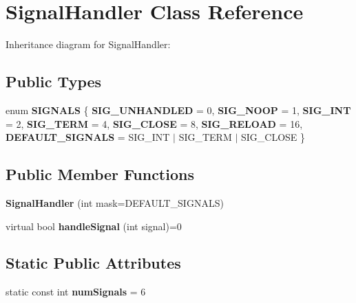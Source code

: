 \hypertarget{class_signal_handler}{}\section{Signal\+Handler Class Reference}
\label{class_signal_handler}


Inheritance diagram for Signal\+Handler\+:
\subsection*{Public Types}
\begin{DoxyCompactItemize}
\item 
\mbox{\label{class_signal_handler_a4fb7422612f6ad73fe4364edb7a37efa}} 
enum {\bfseries S\+I\+G\+N\+A\+LS} \{ \newline
{\bfseries S\+I\+G\+\_\+\+U\+N\+H\+A\+N\+D\+L\+ED} = 0, 
{\bfseries S\+I\+G\+\_\+\+N\+O\+OP} = 1, 
{\bfseries S\+I\+G\+\_\+\+I\+NT} = 2, 
{\bfseries S\+I\+G\+\_\+\+T\+E\+RM} = 4, 
\newline
{\bfseries S\+I\+G\+\_\+\+C\+L\+O\+SE} = 8, 
{\bfseries S\+I\+G\+\_\+\+R\+E\+L\+O\+AD} = 16, 
{\bfseries D\+E\+F\+A\+U\+L\+T\+\_\+\+S\+I\+G\+N\+A\+LS} = S\+I\+G\+\_\+\+I\+NT $\vert$ S\+I\+G\+\_\+\+T\+E\+RM $\vert$ S\+I\+G\+\_\+\+C\+L\+O\+SE
 \}
\end{DoxyCompactItemize}
\subsection*{Public Member Functions}
\begin{DoxyCompactItemize}
\item 
\mbox{\label{class_signal_handler_ab23ae5b558f9d2cf929e1f43d3c7039d}} 
{\bfseries Signal\+Handler} (int mask=D\+E\+F\+A\+U\+L\+T\+\_\+\+S\+I\+G\+N\+A\+LS)
\item 
\mbox{\label{class_signal_handler_ab3288a366fbbc53493e0f2e22afacca4}} 
virtual bool {\bfseries handle\+Signal} (int signal)=0
\end{DoxyCompactItemize}
\subsection*{Static Public Attributes}
\begin{DoxyCompactItemize}
\item 
\mbox{\label{class_signal_handler_ae9142efda56e33a2cec2fc767079fa3d}} 
static const int {\bfseries num\+Signals} = 6
\end{DoxyCompactItemize}


